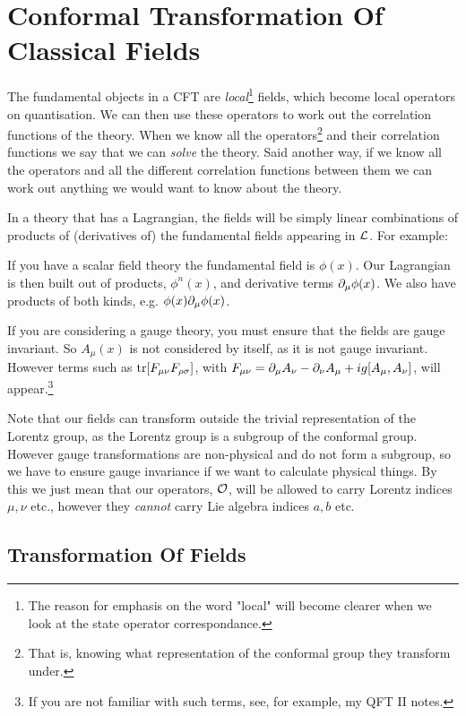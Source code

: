 \chapter{Conformal Transformation Of Classical Fields}

The fundamental objects in a CFT are \textit{local}\footnote{The reason for emphasis on the word "local" will become clearer when we look at the state operator correspondance.} fields, which  become local operators on quantisation. We can then use these operators to work out the correlation functions of the theory. When we know all the operators\footnote{That is, knowing what representation of the conformal group they transform under.} and their correlation functions we say that we can \textit{solve} the theory. Said another way, if we know all the operators and all the different correlation functions between them we can work out anything we would want to know about the theory. 

\bex 
    In a theory that has a Lagrangian, the fields will be simply linear combinations of products of (derivatives of) the fundamental fields appearing in $\mathcal{L}$. For example: 
    \ben[label=(\roman*)]
        \item If you have a scalar field theory the fundamental field is $\phi(x)$. Our Lagrangian is then built out of products, $\phi^n(x)$, and derivative terms $\partial_{\mu}\phi(x)$. We also have products of both kinds, e.g. $\phi(x)\partial_{\mu}\phi(x)$.
        \item If you are considering a gauge theory, you must ensure that the fields are gauge invariant. So $A_{\mu}(x)$ is not considered by itself, as it is not gauge invariant. However terms such as $\tr[F_{\mu\nu}F_{\rho\sigma}]$, with $F_{\mu\nu} = \partial_{\mu}A_{\nu}-\partial_{\nu}A_{\mu} + ig[A_{\mu},A_{\nu}]$, will appear.\footnote{If you are not familiar with such terms, see, for example, my QFT II notes.}
    \een 
\eex 

\br 
\label{rem:FieldsCanHaveLorentzIndices}
    Note that our fields can transform outside the trivial representation of the Lorentz group, as the Lorentz group is a subgroup of the conformal group. However gauge transformations are non-physical and do not form a subgroup, so we have to ensure gauge invariance if we want to calculate physical things. By this we just mean that our operators, $\mathcal{O}$, will be allowed to carry Lorentz indices $\mu,\nu$ etc., however they \textit{cannot} carry Lie algebra indices $a,b$ etc.
\er 

\section{Transformation Of Fields}

